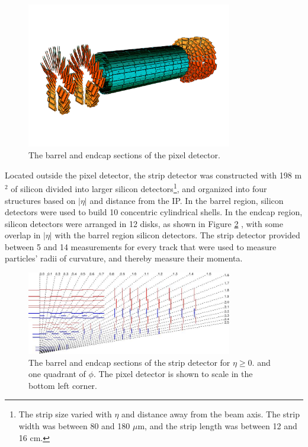 \begin{figure}[ht]
	\centering
	\includegraphics[width=0.8\textwidth]{figures/pixelDetectorSchematic.png}
	\caption{The barrel and endcap sections of the pixel detector.}
	\label{fig:pixelTracker}
\end{figure}

Located outside the pixel detector, the strip detector was constructed with 198 m$^{2}$ of silicon divided into larger silicon 
detectors\footnote{The strip size varied with $\eta$ and distance away from the beam axis.  The strip width was between 80 and 180 
$\mu$m, and the strip length was between 12 and 16 cm.}, and organized into four structures based on $|\eta|$ and distance from the IP.  
In the barrel region, silicon detectors were used to build 10 concentric cylindrical shells.  In the endcap region, silicon 
detectors were arranged in 12 disks, as shown in Figure \ref{fig:stripTracker} \cite{cmsTDR}, with some overlap in $|\eta|$ with 
the barrel region silicon detectors.  The strip detector provided between 5 and 14 measurements for every track that were used 
to measure particles' radii of curvature, and thereby measure their momenta.

\begin{figure}[ht]
	\centering
	\includegraphics[width=0.8\textwidth]{figures/siliconStripAndPixelDetectorTwoDimView.png}
	\caption{The barrel and endcap sections of the strip detector for $\eta \geq 0.$ and one quadrant of $\phi$.  
	The pixel detector is shown to scale in the bottom left corner.}
	\label{fig:stripTracker}
\end{figure}

